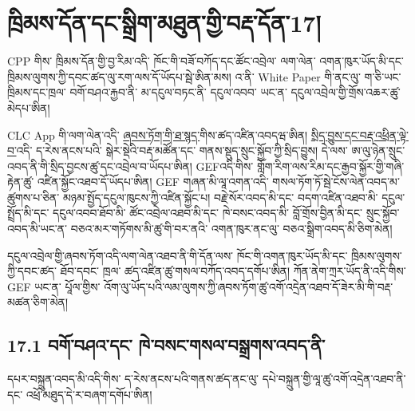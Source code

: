 \documentclass[11pt]{article}
\begin{document}
\section*{ཁྲིམས་དོན་དང་སྒྲིག་མཐུན་གྱི་བརྡ་དོན་17།}

CPP གིས་ ཁྲིམས་དོན་གྱི་བྱ་རིམ་འདི་ ཁོང་གི་བཟོ་བཀོད་དང་ཚོང་འབྲེལ་ ལག་ལེན་ འགན་ཁུར་ཡོད་མི་དང་ ཁྲིམས་ལུགས་ཀྱི་དབང་ཚད་ལུ་རག་ལས་དོ་ཡོདཔ་སྦེ་ཨིན་མས། འ་ནི་ White Paper གི་ནང་ལུ་ ག་ཅི་ཡང་ ཁྲིམས་དང་ཁྲལ་ བགོ་བཤའ་རྐྱབ་ནི་ མ་དངུལ་བཏང་ནི་ དངུལ་འབབ་ ཡང་ན་ དངུལ་འབྲེལ་གྱི་གྲོས་འཆར་ཚུ་མེདཔ་ཨིན།

CLC App གི་ལག་ལེན་འདི་ \href{https://docs.cosmolocal.credit/dz/governance/terms}{ཞབས་ཏོག་གི་ཐ་སྙད་}གིས་ཚད་འཛིན་འབདཝ་ཨིན། \href{https://docs.cosmolocal.credit/dz/governance/policies}{སྲིད་བྱུས་དང་བརྡ་འཕྲིན་ལྟེ་བ་}འདི་ ད་རེས་ནངས་པའི་ སྒེར་སྡེའི་བརྡ་མཚོན་དང་ གནས་སྡུད་སྲུང་སྐྱོབ་ཀྱི་སྲིད་བྱུས། དེ་ལས་ ཨ་ལུ་ཉེན་སྲུང་འབད་ནི་གི་སྲིད་བྱངས་ཚུ་དང་འབྲེལ་བ་ཡོདཔ་ཨིན། GEFའདི་གིས་ གློག་རིག་ལས་རིམ་དང་རྒྱབ་སྐྱོར་གྱི་གཞི་རྟེན་ཚུ་ འཛིན་སྐྱོང་འཐབ་དོ་ཡོདཔ་ཨིན། GEF གཞན་མི་ལཱ་འགན་འདི་ གསལ་ཏོག་ཏོ་སྦེ་ངོས་ལེན་འབད་མ་ཚུགས་པ་ཅིན་ མཉམ་སྤྱོད་དངུལ་ཁུངས་ཀྱི་འཛིན་སྐྱོང་པ། བརྗེ་སོར་འབད་མི་དང་ བདག་འཛིན་འཐབ་མི་ དངུལ་སྤྲོད་མི་དང་ དངུལ་འབབ་ཐོབ་མི་ ཚོང་འབྲེལ་འཐབ་མི་དང་ ཁེ་བསང་འབད་མི་ བློ་གྲོས་བྱིན་མི་དང་ སྲུང་སྐྱོབ་འབད་མི་ཡང་ན་ བཅའ་མར་གཏོགས་མི་ཚུ་གི་བར་ནའི་ འགན་ཁུར་ནང་ལུ་ བཅའ་སྒྲིག་འབད་མི་ཅིག་མེན།

དངུལ་འབྲེལ་གྱི་ཞབས་ཏོག་འདི་ལག་ལེན་འཐབ་ནི་གི་དོན་ལས་ ཁོང་གི་འགན་ཁུར་ཡོད་མི་དང་ ཁྲིམས་ལུགས་ཀྱི་དབང་ཚད་ ཐོབ་དབང་ ཁྲལ་ ཚད་འཛིན་ཚུ་གསལ་བཀོད་འབད་དགོཔ་ཨིན། ཀོན་ནེག་ཀྲར་ཡོད་ནི་འདི་གིས་ GEF ཡང་ན་ པཱོལ་གྱིས་ འོག་ལུ་ཡོད་པའི་ལམ་ལུགས་ཀྱི་ཞབས་ཏོག་ཚུ་འགོ་འདྲེན་འཐབ་དོ་ཟེར་མི་གི་བརྡ་མཚན་ཅིག་མེན།

\subsection*{17.1 བགོ་བཤའ་དང་ ཁེ་བསང་གསལ་བསྒྲགས་འབད་ནི་}

དཔར་བསྐྲུན་འབད་མི་འདི་གིས་ ད་རེས་ནངས་པའི་གནས་ཚད་ནང་ལུ་ དཔེ་བསྐྲུན་གྱི་ལཱ་ཚུ་འགོ་འདྲེན་འཐབ་ནི་དང་ འཕྲོ་མཐུད་དེ་ར་བཞག་དགོཔ་ཨིན།
\end{document}
